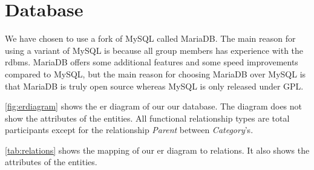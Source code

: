 \section{Database}\label{sec:design_database}
We have chosen to use a fork of MySQL called MariaDB. The main reason for using a variant of MySQL is because all group members has experience with the \ac{rdbms}. MariaDB offers some additional features and some speed improvements compared to MySQL, but the main reason for choosing MariaDB over MySQL is that MariaDB is truly open source whereas MySQL is only released under GPL.\cite{mariavsmysql}

\autoref{fig:erdiagram} shows the \ac{er} diagram of our our database. The diagram does not show the attributes of the entities. All functional relationship types are total participants except for the relationship \textit{Parent} between \textit{Category}'s.

\autoref{tab:relations} shows the mapping of our \ac{er} diagram to relations. It also shows the attributes of the entities.


\newcommand{\relation}[1]{[\{ #1 \}]\\}
\newcommand{\us}{\textunderscore}

